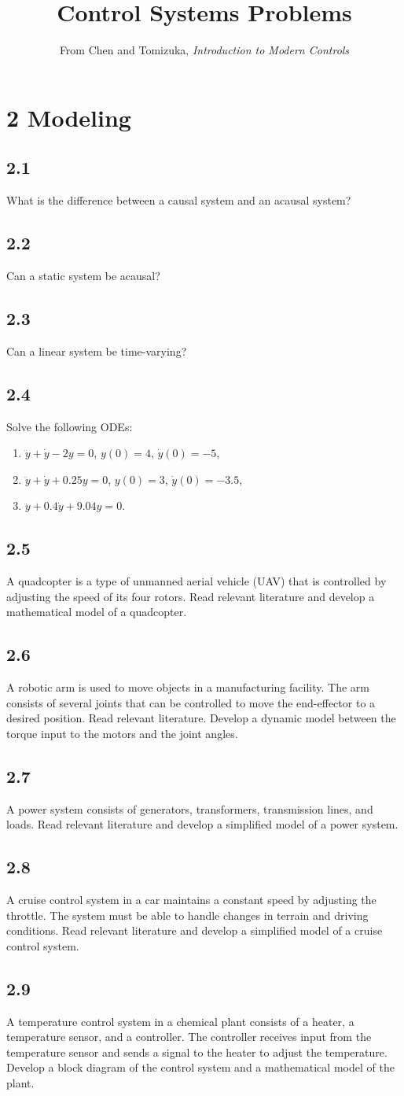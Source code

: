 \documentclass{article}
\title{Control Systems Problems}
\author{From Chen and Tomizuka, \emph{Introduction to Modern Controls}}
\date{}
\newcommand{\problem}[2]{\subsection*{#1}}
\begin{document}
\maketitle

\section*{2 Modeling}

\problem{2.1}{modeling-concepts}
What is the difference between a causal system and an acausal system?

\problem{2.2}{modeling-concepts}
Can a static system be acausal?

\problem{2.3}{modeling-concepts}
Can a linear system be time-varying?

\problem{2.4}{}
Solve the following ODEs:
\begin{enumerate}
\item $\ddot{y} + \dot{y} - 2y = 0$, $y(0) = 4$, $\dot{y}(0) = -5$,
\item $\ddot{y} + \dot{y} + 0.25y = 0$, $y(0) = 3$, $\dot{y}(0) = -3.5$,
\item $\ddot{y} + 0.4\dot{y} + 9.04y = 0$.
\end{enumerate}

\problem{2.5}{modeling-literature}
A quadcopter is a type of unmanned aerial vehicle (UAV) that is controlled by adjusting the speed of its four rotors. Read relevant literature and develop a mathematical model of a quadcopter.

\problem{2.6}{modeling-literature}
A robotic arm is used to move objects in a manufacturing facility. The arm consists of several joints that can be controlled to move the end-effector to a desired position. Read relevant literature. Develop a dynamic model between the torque input to the motors and the joint angles.

\problem{2.7}{modeling-literature}
A power system consists of generators, transformers, transmission lines, and loads. Read relevant literature and develop a simplified model of a power system.

\problem{2.8}{modeling-literature}
A cruise control system in a car maintains a constant speed by adjusting the throttle. The system must be able to handle changes in terrain and driving conditions. Read relevant literature and develop a simplified model of a cruise control system.

\problem{2.9}{modeling-literature}
A temperature control system in a chemical plant consists of a heater, a temperature sensor, and a controller. The controller receives input from the temperature sensor and sends a signal to the heater to adjust the temperature. Develop a block diagram of the control system and a mathematical model of the plant.
\end{document}
